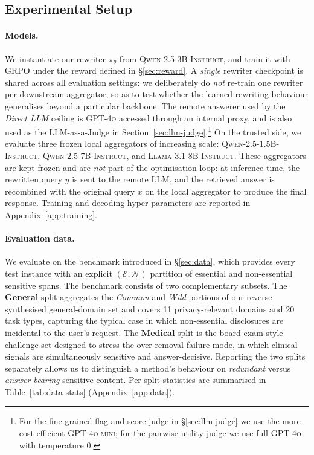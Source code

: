 \subsection{Experimental Setup}
\label{sec:exp-setup}

\paragraph{Models.}
We instantiate our rewriter $\pi_\theta$ from
\textsc{Qwen-2.5-3B-Instruct}, and train it with GRPO under the reward
defined in \S\ref{sec:reward}. A \emph{single} rewriter checkpoint is
shared across all evaluation settings: we deliberately do \emph{not}
re-train one rewriter per downstream aggregator, so as to test whether
the learned rewriting behaviour generalises beyond a particular
backbone. The remote answerer used by the \textit{Direct LLM} ceiling
is \textsc{GPT-4o} accessed through an internal proxy, and is also
used as the LLM-as-a-Judge in
Section~\ref{sec:llm-judge}.\footnote{For the fine-grained
flag-and-score judge in \S\ref{sec:llm-judge} we use the more
cost-efficient \textsc{GPT-4o-mini}; for the pairwise utility judge we
use full \textsc{GPT-4o} with temperature $0$.} On the trusted side,
we evaluate three frozen local aggregators of increasing scale:
\textsc{Qwen-2.5-1.5B-Instruct}, \textsc{Qwen-2.5-7B-Instruct}, and
\textsc{Llama-3.1-8B-Instruct}. These aggregators are kept frozen and
are \emph{not} part of the optimisation loop: at inference time, the
rewritten query $y$ is sent to the remote LLM, and the retrieved
answer is recombined with the original query $x$ on the local
aggregator to produce the final response. Training and decoding
hyper-parameters are reported in Appendix~\ref{app:training}.

\paragraph{Evaluation data.}
We evaluate on the benchmark introduced in \S\ref{sec:data}, which
provides every test instance with an explicit
$(\mathcal{E},\mathcal{N})$ partition of essential and non-essential
sensitive spans. The benchmark consists of two complementary subsets.
The \textbf{General} split aggregates the \emph{Common} and
\emph{Wild} portions of our reverse-synthesised general-domain set and
covers 11 privacy-relevant domains and 20 task types, capturing the
typical case in which non-essential disclosures are incidental to the
user's request. The \textbf{Medical} split is the board-exam-style
challenge set designed to stress the over-removal failure mode, in
which clinical signals are simultaneously sensitive and
answer-decisive. Reporting the two splits separately allows us to
distinguish a method's behaviour on \emph{redundant} versus
\emph{answer-bearing} sensitive content. Per-split statistics are
summarised in Table~\ref{tab:data-stats} (Appendix~\ref{app:data}).

